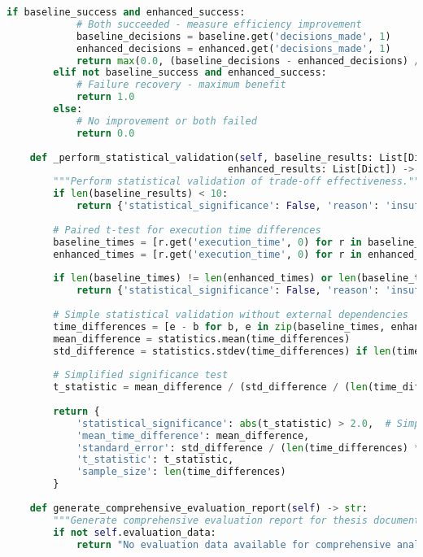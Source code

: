 \begin{lstlisting}[language=Python, caption=Multi-dimensional Trade-off Analysis and Characterisation]
        if baseline_success and enhanced_success:
            # Both succeeded - measure efficiency improvement
            baseline_decisions = baseline.get('decisions_made', 1)
            enhanced_decisions = enhanced.get('decisions_made', 1)
            return max(0.0, (baseline_decisions - enhanced_decisions) / baseline_decisions)
        elif not baseline_success and enhanced_success:
            # Failure recovery - maximum benefit
            return 1.0
        else:
            # No improvement or both failed
            return 0.0
    
    def _perform_statistical_validation(self, baseline_results: List[Dict], 
                                      enhanced_results: List[Dict]) -> Dict:
        """Perform statistical validation of trade-off effectiveness."""
        if len(baseline_results) < 10:
            return {'statistical_significance': False, 'reason': 'insufficient_sample_size'}
        
        # Paired t-test for execution time differences
        baseline_times = [r.get('execution_time', 0) for r in baseline_results if r.get('execution_time', 0) > 0]
        enhanced_times = [r.get('execution_time', 0) for r in enhanced_results if r.get('execution_time', 0) > 0]
        
        if len(baseline_times) != len(enhanced_times) or len(baseline_times) < 10:
            return {'statistical_significance': False, 'reason': 'insufficient_valid_measurements'}
        
        # Simple statistical validation without external dependencies
        time_differences = [e - b for b, e in zip(baseline_times, enhanced_times)]
        mean_difference = statistics.mean(time_differences)
        std_difference = statistics.stdev(time_differences) if len(time_differences) > 1 else 0.0
        
        # Simplified significance test
        t_statistic = mean_difference / (std_difference / (len(time_differences) ** 0.5)) if std_difference > 0 else 0.0
        
        return {
            'statistical_significance': abs(t_statistic) > 2.0,  # Simplified threshold
            'mean_time_difference': mean_difference,
            'standard_error': std_difference / (len(time_differences) ** 0.5),
            't_statistic': t_statistic,
            'sample_size': len(time_differences)
        }
    
    def generate_comprehensive_evaluation_report(self) -> str:
        """Generate comprehensive evaluation report for thesis documentation."""
        if not self.evaluation_data:
            return "No evaluation data available for comprehensive analysis."
        

\end{lstlisting}
